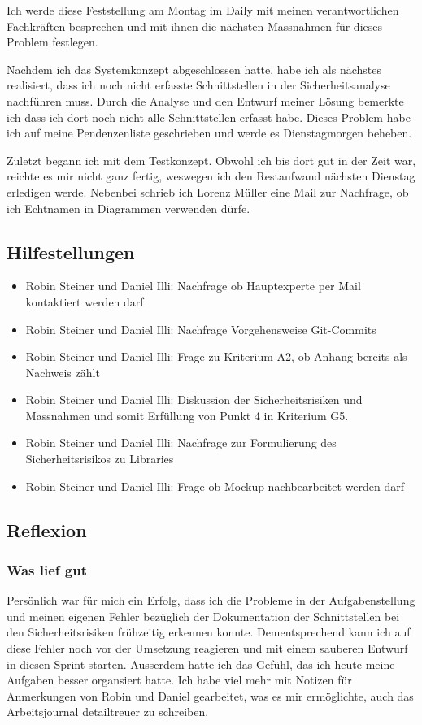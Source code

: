 Ich werde diese Feststellung am Montag im Daily mit meinen verantwortlichen Fachkräften besprechen und mit ihnen die nächsten Massnahmen für dieses Problem festlegen.

Nachdem ich das Systemkonzept abgeschlossen hatte, habe ich als nächstes realisiert, dass ich noch nicht erfasste Schnittstellen in der Sicherheitsanalyse nachführen muss.
Durch die Analyse und den Entwurf meiner Lösung bemerkte ich dass ich dort noch nicht alle Schnittstellen erfasst habe. Dieses Problem habe ich auf meine Pendenzenliste geschrieben
und werde es Dienstagmorgen beheben.

Zuletzt begann ich mit dem Testkonzept. Obwohl ich bis dort gut in der Zeit war, reichte es mir nicht ganz fertig, weswegen ich den Restaufwand nächsten Dienstag erledigen werde.
Nebenbei schrieb ich Lorenz Müller eine Mail zur Nachfrage, ob ich Echtnamen in Diagrammen verwenden dürfe.

\subsection*{Hilfestellungen}
\begin{itemize}
    \item Robin Steiner und Daniel Illi: Nachfrage ob Hauptexperte per Mail kontaktiert werden darf
    \item Robin Steiner und Daniel Illi: Nachfrage Vorgehensweise Git-Commits
    \item Robin Steiner und Daniel Illi: Frage zu Kriterium A2, ob Anhang bereits als Nachweis zählt
    \item Robin Steiner und Daniel Illi: Diskussion der Sicherheitsrisiken und Massnahmen und somit Erfüllung von Punkt 4 in Kriterium G5.
    \item Robin Steiner und Daniel Illi: Nachfrage zur Formulierung des Sicherheitsrisikos zu Libraries
    \item Robin Steiner und Daniel Illi: Frage ob Mockup nachbearbeitet werden darf
\end{itemize}

\subsection*{Reflexion}

\subsubsection*{Was lief gut}
Persönlich war für mich ein Erfolg, dass ich die Probleme in der Aufgabenstellung und meinen eigenen Fehler bezüglich der Dokumentation der Schnittstellen
bei den Sicherheitsrisiken frühzeitig erkennen konnte. Dementsprechend kann ich auf diese Fehler noch vor der Umsetzung reagieren und mit einem sauberen Entwurf in diesen Sprint
starten. Ausserdem hatte ich das Gefühl, das ich heute meine Aufgaben besser organsiert hatte. Ich habe viel mehr mit Notizen für Anmerkungen von Robin und Daniel gearbeitet,
was es mir ermöglichte, auch das Arbeitsjournal detailtreuer zu schreiben.

